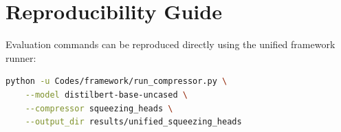 \section{Reproducibility Guide}
Evaluation commands can be reproduced directly using the unified framework runner:
\begin{lstlisting}[language=bash]
python -u Codes/framework/run_compressor.py \
    --model distilbert-base-uncased \
    --compressor squeezing_heads \
    --output_dir results/unified_squeezing_heads
\end{lstlisting}
